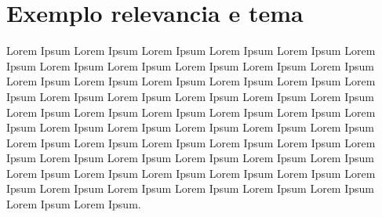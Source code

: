 \section{Exemplo relevancia e tema}

Lorem Ipsum Lorem Ipsum Lorem Ipsum Lorem Ipsum Lorem Ipsum Lorem Ipsum Lorem Ipsum Lorem Ipsum Lorem Ipsum Lorem Ipsum Lorem Ipsum Lorem Ipsum Lorem Ipsum Lorem Ipsum Lorem Ipsum Lorem Ipsum Lorem Ipsum Lorem Ipsum Lorem Ipsum Lorem Ipsum Lorem Ipsum Lorem Ipsum Lorem Ipsum Lorem Ipsum Lorem Ipsum Lorem Ipsum Lorem Ipsum Lorem Ipsum Lorem Ipsum Lorem Ipsum Lorem Ipsum Lorem Ipsum Lorem Ipsum Lorem Ipsum Lorem Ipsum Lorem Ipsum Lorem Ipsum Lorem Ipsum Lorem Ipsum Lorem Ipsum Lorem Ipsum Lorem Ipsum Lorem Ipsum Lorem Ipsum Lorem Ipsum Lorem Ipsum Lorem Ipsum Lorem Ipsum Lorem Ipsum Lorem Ipsum Lorem Ipsum Lorem Ipsum Lorem Ipsum Lorem Ipsum Lorem Ipsum Lorem Ipsum Lorem Ipsum.
